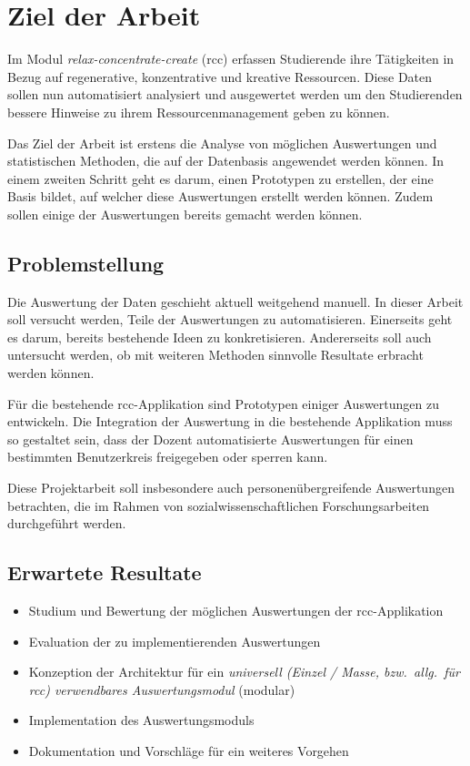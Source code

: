  
\section{Ziel der Arbeit}
\label{sec:ziel_der_arbeit}

Im Modul \textit{relax-concentrate-create} (rcc) erfassen Studierende ihre Tätigkeiten in Bezug auf
regenerative, konzentrative und kreative Ressourcen. Diese Daten sollen nun automatisiert analysiert
und ausgewertet werden um den Studierenden bessere Hinweise zu ihrem Ressourcenmanagement geben zu
können. 

Das Ziel der Arbeit ist erstens die Analyse von möglichen Auswertungen und statistischen Methoden,
die auf der Datenbasis angewendet werden können. In einem zweiten Schritt geht es darum, einen
Prototypen zu erstellen, der eine Basis bildet, auf welcher diese Auswertungen erstellt werden
können. Zudem sollen einige der Auswertungen bereits gemacht werden können.

\subsection{Problemstellung}
\label{sub:problemstellung}

Die Auswertung der Daten geschieht aktuell weitgehend manuell. In dieser Arbeit soll versucht
werden, Teile der Auswertungen zu automatisieren. Einerseits geht es darum, bereits bestehende Ideen
zu konkretisieren. Andererseits soll auch untersucht werden, ob mit weiteren Methoden sinnvolle
Resultate erbracht werden können.

Für die bestehende rcc-Applikation sind Prototypen einiger Auswertungen zu entwickeln. Die
Integration der Auswertung in die bestehende Applikation muss so gestaltet sein, dass der Dozent
automatisierte Auswertungen für einen bestimmten Benutzerkreis freigegeben oder sperren kann.

Diese Projektarbeit soll insbesondere auch personenübergreifende Auswertungen betrachten, die im
Rahmen von sozialwissenschaftlichen Forschungsarbeiten durchgeführt werden.


\subsection{Erwartete Resultate}
\label{sub:erwartete_resultate}

\begin{itemize}
  \item Studium und Bewertung der möglichen Auswertungen der rcc-Applikation
  \item Evaluation der zu implementierenden Auswertungen
  \item Konzeption der Architektur für ein \textit{universell (Einzel / Masse, bzw.\ allg.\ für rcc)
    verwendbares Auswertungsmodul} (modular)
    \item Implementation des Auswertungsmoduls
  \item Dokumentation und Vorschläge für ein weiteres Vorgehen
\end{itemize}

